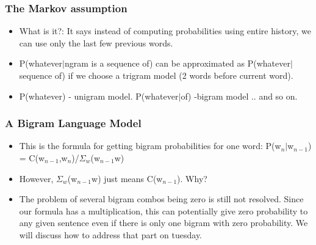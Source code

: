 \documentclass{beamer}
\begin{document}
\begin{frame}
\frametitle{The Markov assumption}
\begin{itemize}
\item What is it?: It says instead of computing probabilities using entire history, we can use only the last few previous words.
\item P(whatever$|$ngram is a sequence of) can be approximated as P(whatever$|$sequence of) if we choose a trigram model (2 words before current word).
\item P(whatever) - unigram model. P(whatever$|$of) -bigram model .. and so on. 
\end{itemize}
\end{frame}

\begin{frame}
\frametitle{A Bigram Language Model}
\begin{itemize}
\item This is the formula for getting bigram probabilities for one word: P(w$_n|$w$_{n-1}$) = C(w$_{n-1}$,w$_{n}$)/$\Sigma_w$(w$_{n-1}$w) \pause
\item However, $\Sigma_w$(w$_{n-1}$w) just means C(w$_{n-1}$). Why? \pause
\item The problem of several bigram combos being zero is still not resolved. Since our formula has a multiplication, this can potentially give zero probability to any given sentence even if there is only one bigram with zero probability. We will discuss how to address that part on tuesday.
\end{itemize}
\end{frame}
\end{document}
